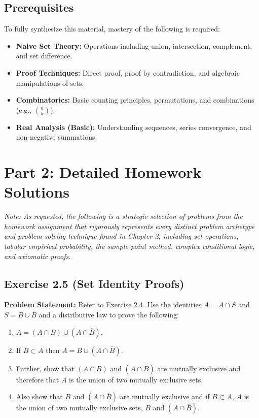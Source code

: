 \documentclass[12pt]{article}
\begin{document}
\subsection{Prerequisites}
To fully synthesize this material, mastery of the following is required:
\begin{itemize}
    \item \textbf{Naive Set Theory:} Operations including union, intersection, complement, and set difference.
    \item \textbf{Proof Techniques:} Direct proof, proof by contradiction, and algebraic manipulations of sets.
    \item \textbf{Combinatorics:} Basic counting principles, permutations, and combinations (e.g., $\binom{n}{k}$).
    \item \textbf{Real Analysis (Basic):} Understanding sequences, series convergence, and non-negative summations.
\end{itemize}

\newpage
\section{Part 2: Detailed Homework Solutions}

\textit{Note: As requested, the following is a strategic selection of problems from the homework assignment that rigorously represents every distinct problem archetype and problem-solving technique found in Chapter 2, including set operations, tabular empirical probability, the sample-point method, complex conditional logic, and axiomatic proofs.}

\subsection*{Exercise 2.5 (Set Identity Proofs)}
\textbf{Problem Statement:} Refer to Exercise 2.4. Use the identities $A = A \cap S$ and $S = B \cup \overline{B}$ and a distributive law to prove the following:
\begin{enumerate}
    \item[a.] $A = (A \cap B) \cup (A \cap \overline{B})$.
    \item[b.] If $B \subset A$ then $A = B \cup (A \cap \overline{B})$.
    \item[c.] Further, show that $(A \cap B)$ and $(A \cap \overline{B})$ are mutually exclusive and therefore that $A$ is the union of two mutually exclusive sets.
    \item[d.] Also show that $B$ and $(A \cap \overline{B})$ are mutually exclusive and if $B \subset A$, $A$ is the union of two mutually exclusive sets, $B$ and $(A \cap \overline{B})$.
\end{enumerate}
\end{document}
